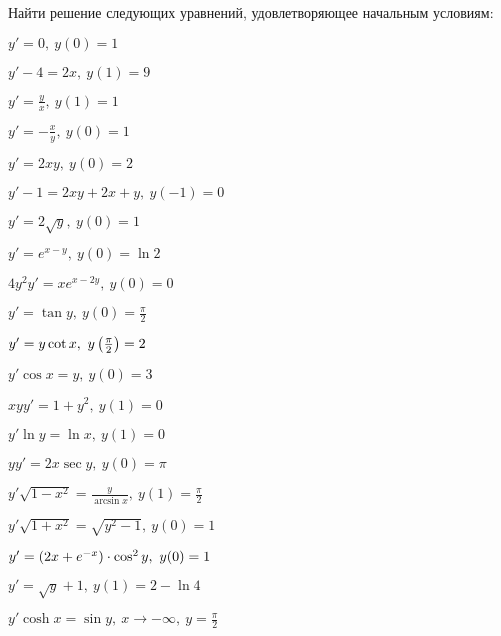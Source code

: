 	Найти решение следующих уравнений, удовлетворяющее начальным условиям:
	\begin{multicols}{2}
		\begin{enumtasks}

			\label{firstorder:separable_cauchy}
			\item \( y' = 0, ~ y(0) = 1 \) 													%
			\item \( y' - 4 = 2x, ~ y(1) = 9 \) 											%
			\item \( y' = \frac{y}{x}, ~ y(1) = 1 \) 										%
			\item \( y' = -\frac{x}{y}, ~ y(0) = 1 \) 										%
			\item \( y' = 2xy, ~ y(0) = 2 \)												%
			\item \( y' - 1 = 2xy + 2x + y, ~ y(-1) = 0 \) 									%
			\item \( y' = 2\sqrt{y}, ~ y(0) = 1 \)											%
			\item \( y' = e^{x - y}, ~ y(0) = \ln{2} \)										%
			\item \( 4y^2 y' = xe^{x - 2y}, ~ y(0) = 0 \)									%
			\item \( y' = \tan{y}, ~ y(0) = \frac{\pi}{2} \)								%
			\item \( y' = y \cot{x}, ~ y \left( \frac{\pi}{2} \right) = 2 \)						%
			\item \( y' \cos{x} = y, ~ y(0) = 3 \) 											%
			\item \( xyy' = 1 + y^2, ~ y(1) = 0 \)											%
			\item \( y'\ln{y} = \ln{x}, ~ y(1) = 0 \) 										%
			\item \( yy' = 2x \sec{y}, ~ y(0) = \pi \)										%
			\item \( y' \sqrt{1 - x^2} = \frac{y}{\arcsin{x}}, ~ y(1) = \frac{\pi}{2} \)	%
			\item \( y' \sqrt{1 + x^2} = \sqrt{y^2 - 1}, ~ y(0) = 1 \) 						%
			\item \( y' = \left( 2x + e^{-x} \right) \cdot \cos^2{y}, ~ y(0) = 1 \)				%
			\item \( y' = \sqrt{y} + 1, ~ y(1) = 2 - \ln{4} \) 								%
			\item \( y' \cosh{x} = \sin{y}, ~ x \to -\infty, ~ y = \frac{\pi}{2} \) 		%

		\end{enumtasks}
	\end{multicols}